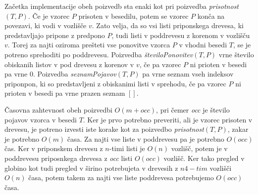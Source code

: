Začetka implementacije obeh poizvedb sta enaki kot pri poizvedba \textit{prisotnost}$(T,P)$. Če je vzorec $P$ prisoten v besedilu, potem se vzorec $P$ konča na povezavi, ki vodi v vozlišče $v$. Zato velja, da so vsi listi priponskega drevesa, ki predstavljajo pripone z predpono $P$, tudi listi v poddrevesu z korenom v vozlišču $v$. Torej za najti oziroma prešteti vse ponovitve vzorca $P$ v vhodni besedi $T$, se je potreno sprehoditi po poddrevesu. Poizvedba \textit{številoPonovitev}$(T,P)$ vrne število obiskanih listov v pod drevesu z korenov v $v$, če pa vzorec $P$ ni prioten v besedi pa vrne $0$. Poizvedba \textit{seznamPojavov}$(T,P)$ pa vrne seznam vseh indeksov priponpon, ki so predstavljeni z obiskanimi listi v sprehodu, če pa vzorec $P$ ni prioten v besedi pa vrne prazen seznam $[]$.

Časovna zahtevnost obeh poizvedbi $O(m+\textit{occ})$, pri čemer \textit{occ} je število pojavov vzorca v besedi $T$. Ker je prvo potrebno preveriti, ali je vzorec prisoten v drevesu, je potreno izvesti iste korake kot za poizvedbo \textit{prisotnost}$(T,P)$, zakar je potrebno $O(m)$ časa. Za najti vse liste v poddrevesu pa je potrebno $O(\textit{occ})$ čas. Ker v priponskem drevesu z $n$-timi listi je $O(n)$ vozlišč, potem je v poddrevesu priposnkega drevesa z \textit{occ} listi $O(\textit{occ})$ vozlišč. Ker tako pregled v globino kot tudi pregled v širino potrebujeta v drevesih z $n4-tim$ vozlišči $O(n)$ časa, potem takem za najti vse liste poddrevesa potrebujemo $O(\textit{occ})$ časa.

